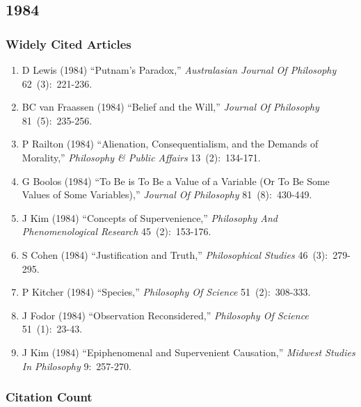 \documentclass[
  10pt,
  letterpaper,
  DIV=11,
  numbers=noendperiod,
  twoside]{scrartcl}
\providecommand{\tightlist}{%
  \setlength{\itemsep}{0pt}\setlength{\parskip}{0pt}}\usepackage{longtable,booktabs,array}
\begin{document}
\newpage

\subsection{1984}\label{sec-s1984}

\subsubsection*{Widely Cited Articles}\label{widely-cited-articles-27}

\begin{enumerate}
\def\labelenumi{\arabic{enumi}.}
\tightlist
\item
  D Lewis (1984) ``Putnam's Paradox,'' \emph{Australasian Journal Of
  Philosophy} 62~(3):~221-236.
\item
  BC van Fraassen (1984) ``Belief and the Will,'' \emph{Journal Of
  Philosophy} 81~(5):~235-256.
\item
  P Railton (1984) ``Alienation, Consequentialism, and the Demands of
  Morality,'' \emph{Philosophy \& Public Affairs} 13~(2):~134-171.
\item
  G Boolos (1984) ``To Be is To Be a Value of a Variable (Or To Be Some
  Values of Some Variables),'' \emph{Journal Of Philosophy}
  81~(8):~430-449.
\item
  J Kim (1984) ``Concepts of Supervenience,'' \emph{Philosophy And
  Phenomenological Research} 45~(2):~153-176.
\item
  S Cohen (1984) ``Justification and Truth,'' \emph{Philosophical
  Studies} 46~(3):~279-295.
\item
  P Kitcher (1984) ``Species,'' \emph{Philosophy Of Science}
  51~(2):~308-333.
\item
  J Fodor (1984) ``Observation Reconsidered,'' \emph{Philosophy Of
  Science} 51~(1):~23-43.
\item
  J Kim (1984) ``Epiphenomenal and Supervenient Causation,''
  \emph{Midwest Studies In Philosophy} 9:~257-270.
\end{enumerate}

\subsubsection*{Citation Count}\label{sec-count-1984}
\end{document}
